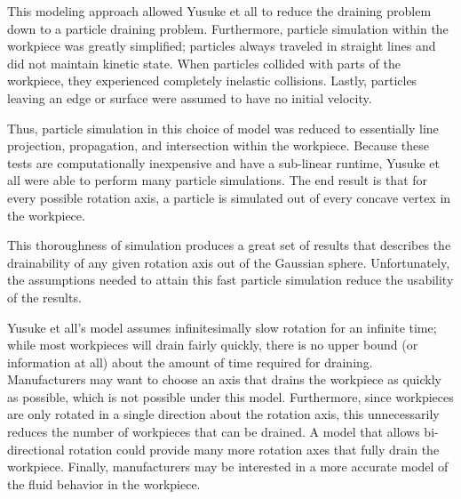 This modeling approach allowed Yusuke et all to reduce the draining problem down to a particle draining problem. Furthermore, particle simulation within the workpiece was greatly simplified; particles always traveled in straight lines and did not maintain kinetic state. When particles collided with parts of the workpiece, they experienced completely inelastic collisions. Lastly, particles leaving an edge or surface were assumed to have no initial velocity.

Thus, particle simulation in this choice of model was reduced to essentially line projection, propagation, and intersection within the workpiece. Because these tests are computationally inexpensive and have a sub-linear runtime, Yusuke et all were able to perform many particle simulations. The end result is that for every possible rotation axis, a particle is simulated out of every concave vertex in the workpiece.

This thoroughness of simulation produces a great set of results that describes the drainability of any given rotation axis out of the Gaussian sphere. Unfortunately, the assumptions needed to attain this fast particle simulation reduce the usability of the results.

Yusuke et all's model assumes infinitesimally slow rotation for an infinite time; while most workpieces will drain fairly quickly, there is no upper bound (or information at all) about the amount of time required for draining. Manufacturers may want to choose an axis that drains the workpiece as quickly as possible, which is not possible under this model.
Furthermore, since workpieces are only rotated in a single direction about the rotation axis, this unnecessarily reduces the number of workpieces that can be drained. A model that allows bi-directional rotation could provide many more rotation axes that fully drain the workpiece. Finally, manufacturers may be interested in a more accurate model of the fluid behavior in the workpiece.




